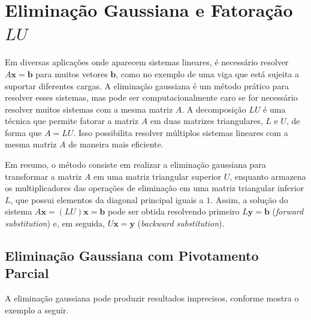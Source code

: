 \documentclass{article}
\theoremstyle{plain}
\theoremstyle{definition}
\theoremstyle{remark}
\begin{document}
\newpage

\section{Eliminação Gaussiana e Fatoração \(LU\)}

Em diversas aplicações onde aparecem sistemas lineares, é necessário resolver \(A\mathbf{x}=\mathbf{b}\) para muitos vetores \(\mathbf{b}\), como no exemplo de uma viga que está sujeita a suportar diferentes cargas. A eliminação gaussiana é um método prático para resolver esses sistemas, mas pode ser computacionalmente caro se for necessário resolver muitos sistemas com a mesma matriz \(A\). A decomposição \(LU\) é uma técnica que permite fatorar a matriz \(A\) em duas matrizes triangulares, \(L\) e \(U\), de forma que \(A = LU\). Isso possibilita resolver múltiplos sistemas lineares com a mesma matriz \(A\) de maneira mais eficiente.

Em resumo, o método consiste em realizar a eliminação gaussiana para transformar a matriz \(A\) em uma matriz triangular superior \(U\), enquanto armazena os multiplicadores das operações de eliminação em uma matriz triangular inferior \(L\), que possui elementos da diagonal principal iguais a \(1\). Assim, a solução do sistema \(A\mathbf{x} = (LU)\mathbf{x} = \mathbf{b}\) pode ser obtida resolvendo primeiro \(L\mathbf{y} = \mathbf{b}\) (\textit{forward substitution}) e, em seguida, \(U\mathbf{x} = \mathbf{y}\) (\textit{backward substitution}).

\subsection{Eliminação Gaussiana com Pivotamento Parcial}

A eliminação gaussiana pode produzir resultados imprecisos, conforme mostra o exemplo a seguir.
\end{document}
